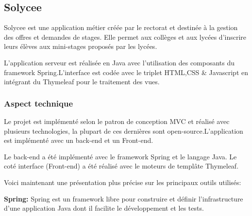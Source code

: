\documentclass[12pt]{article}
\begin{document}
\subsection{Solycee}

Solycee est une application métier créée par le rectorat et destinée à la gestion des offres et demandes de stages. Elle permet aux collèges et aux lycées d'inscrire leurs élèves aux mini-stages proposés par les lycées.

L'application serveur est réalisée en Java avec l'utilisation des composants du framework Spring.L'interface est codée avec le triplet HTML,CSS \& Javascript en intégrant du Thymeleaf pour le traitement des vues.

\subsubsection{Aspect technique}

Le projet est implémenté selon le patron de conception MVC et réalisé avec plusieurs technologies, la plupart de ces dernières sont open-source.L'application est implémenté avec un back-end et un Front-end.

Le back-end a été implémenté avec le framework Spring et le langage Java. Le coté interface (Front-end) a été réalisé avec le moteurs de templâte Thymeleaf.

Voici maintenant une présentation plus précise sur les principaux outils utilisés:\newline

\textbf{Spring:}  Spring est un framework libre pour construire et définir l'infrastructure d'une application Java dont il facilite le développement et les tests.\newline
\end{document}
